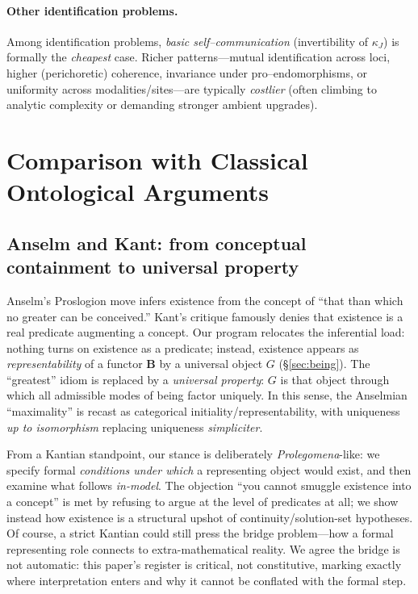 \documentclass[11pt]{article}
\theoremstyle{upright}
\begin{document}
\paragraph{Other identification problems.}
Among identification problems, \emph{basic self–communication} (invertibility of $\kappa_J$) is formally the \emph{cheapest} case. Richer patterns—mutual identification across loci, higher (perichoretic) coherence, invariance under pro–endomorphisms, or uniformity across modalities/sites—are typically \emph{costlier} (often climbing to analytic complexity or demanding stronger ambient upgrades).

\section{Comparison with Classical Ontological Arguments}\label{sec:compare}

\subsection{Anselm and Kant: from conceptual containment to universal property}
Anselm’s Proslogion \citep{Anselm1965} move infers existence from the concept of “that than which no greater can be conceived.” Kant’s critique famously denies that existence is a real predicate augmenting a concept. Our program relocates the inferential load: nothing turns on existence as a predicate; instead, existence appears as \emph{representability} of a functor \(\mathbf B\) by a universal object \(G\) (\S\ref{sec:being}). The “greatest” idiom is replaced by a \emph{universal property}: \(G\) is that object through which all admissible modes of being factor uniquely. In this sense, the Anselmian “maximality” is recast as categorical initiality/representability, with uniqueness \emph{up to isomorphism} replacing uniqueness \emph{simpliciter}.

From a Kantian standpoint, our stance is deliberately \emph{Prolegomena}-like: we specify formal \emph{conditions under which} a representing object would exist, and then examine what follows \emph{in-model}. The objection “you cannot smuggle existence into a concept” is met by refusing to argue at the level of predicates at all; we show instead how existence is a structural upshot of continuity/solution-set hypotheses. Of course, a strict Kantian could still press the bridge problem—how a formal representing role connects to extra-mathematical reality. We agree the bridge is not automatic: this paper’s register is critical, not constitutive, marking exactly where interpretation enters and why it cannot be conflated with the formal step.
\end{document}
